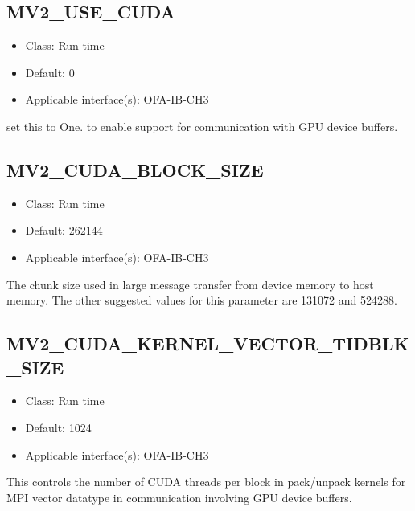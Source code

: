 \subsection{MV2\_USE\_CUDA}
\label{def:use-cuda}

\begin{itemize}
        \item Class: Run time
        \item Default: 0
        \item Applicable interface(s): OFA-IB-CH3
\end{itemize}
set this to One. to enable support for communication with GPU device buffers.

\subsection{MV2\_CUDA\_BLOCK\_SIZE}
\label{def:cuda-block-size}

\begin{itemize}
        \item Class: Run time
        \item Default: 262144
        \item Applicable interface(s): OFA-IB-CH3
\end{itemize}
The chunk size used in large message transfer from device memory to host memory.
The other suggested values for this parameter are 131072 and 524288.

%

\subsection{MV2\_CUDA\_KERNEL\_VECTOR\_TIDBLK\_SIZE}
\label{def:cuda-kernel-vector-threadblock}

\begin{itemize}
        \item Class: Run time
        \item Default: 1024
        \item Applicable interface(s): OFA-IB-CH3
\end{itemize}
This controls the number of CUDA threads per block in pack/unpack kernels for MPI vector datatype in communication 
involving GPU device buffers.

